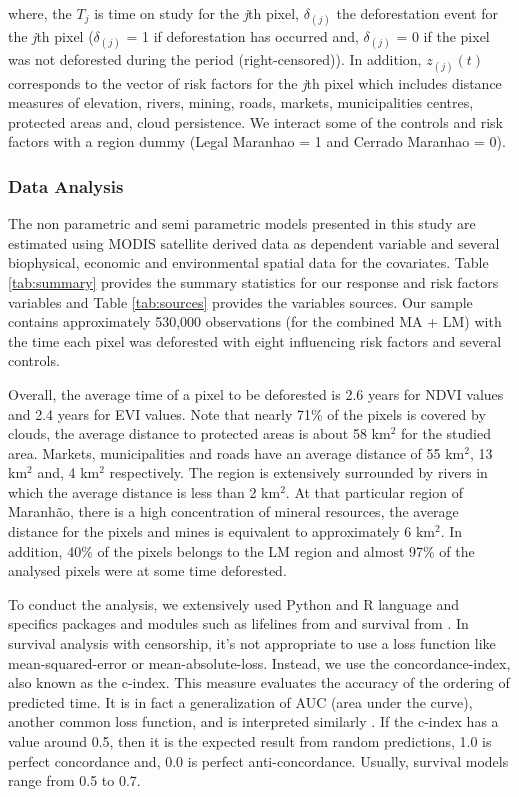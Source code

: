 where, the $T_{j}$ is time on study for the \textit{j}th pixel, $\delta_{(j)}$ the deforestation event for the \textit{j}th pixel ($\delta_{(j)}$ = 1 if deforestation has occurred and, $\delta_{(j)}$ = 0 if the pixel was not deforested during the period (right-censored)). In addition, $z_{(j)}(t)$ corresponds to the vector of risk factors for the  \textit{j}th pixel which includes distance measures of elevation, rivers, mining, roads, markets, municipalities centres, protected areas and, cloud persistence. We interact some of the controls and risk factors with a region dummy (Legal Maranhao = 1 and Cerrado Maranhao = 0).


\subsubsection{Data Analysis}  %

The non parametric and semi parametric models presented in this study are estimated using MODIS satellite derived data as dependent variable and several biophysical, economic and environmental spatial data for the covariates. Table \ref{tab:summary} provides the summary statistics for our response and risk factors variables and Table \ref{tab:sources} provides the variables sources. Our sample contains approximately 530,000 observations (for the combined MA + LM) with the time each pixel was deforested with eight influencing risk factors and several controls.

Overall, the average time of a pixel to be deforested is 2.6 years for NDVI values and 2.4 years for EVI values. Note that nearly 71\% of the pixels is covered by clouds, the average distance to protected areas is about 58 km$^{2}$ for the studied area. Markets, municipalities and roads have an average distance of 55 km$^{2}$, 13 km$^{2}$ and, 4 km$^{2}$ respectively. The region is extensively surrounded by rivers in which the average distance is less than 2 km$^{2}$. At that particular region of Maranhão, there is a high concentration of mineral resources, the average distance for the pixels and mines is equivalent to approximately 6 km$^{2}$. In addition, 40\% of the pixels belongs to the LM region and almost 97\% of the analysed pixels were at some time deforested.

To conduct the analysis, we extensively used Python and R language and specifics packages and modules such as lifelines from \citet{cameron_2018} and survival from \citet{survival-book,survival-package}. In survival analysis with censorship, it’s not appropriate to use a loss function like mean-squared-error or mean-absolute-loss. Instead, we use the concordance-index, also known as the c-index. This measure evaluates the accuracy of the ordering of predicted time. It is in fact a generalization of AUC (area under the curve), another common loss function, and is interpreted similarly \citep{cameron_2018}. If the c-index has a value around 0.5, then it is the expected result from random predictions, 1.0 is perfect concordance and, 0.0 is perfect anti-concordance. Usually, survival models range from 0.5 to 0.7.

